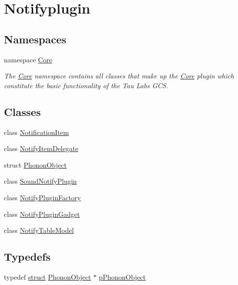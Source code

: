\hypertarget{group__notifyplugin}{\section{Notifyplugin}
\label{group__notifyplugin}
}
\subsection*{Namespaces}
\begin{DoxyCompactItemize}
\item 
namespace \hyperlink{namespace_core}{Core}
\begin{DoxyCompactList}\small\item\em The \hyperlink{namespace_core}{Core} namespace contains all classes that make up the \hyperlink{namespace_core}{Core} plugin which constitute the basic functionality of the Tau Labs G\-C\-S. \end{DoxyCompactList}\end{DoxyCompactItemize}
\subsection*{Classes}
\begin{DoxyCompactItemize}
\item 
class \hyperlink{class_notification_item}{Notification\-Item}
\item 
class \hyperlink{class_notify_item_delegate}{Notify\-Item\-Delegate}
\item 
struct \hyperlink{struct_phonon_object}{Phonon\-Object}
\item 
class \hyperlink{class_sound_notify_plugin}{Sound\-Notify\-Plugin}
\item 
class \hyperlink{class_notify_plugin_factory}{Notify\-Plugin\-Factory}
\item 
class \hyperlink{class_notify_plugin_gadget}{Notify\-Plugin\-Gadget}
\item 
class \hyperlink{class_notify_table_model}{Notify\-Table\-Model}
\end{DoxyCompactItemize}
\subsection*{Typedefs}
\begin{DoxyCompactItemize}
\item 
typedef \hyperlink{sdlgamepad_8dox_aba655c5729da86df745f0c8e7f9ba8d2}{struct} \hyperlink{struct_phonon_object}{Phonon\-Object} $\ast$ \hyperlink{group__notifyplugin_ga29339e638aa7c15d99ff655f2f0e2c89}{p\-Phonon\-Object}
\end{DoxyCompactItemize}

